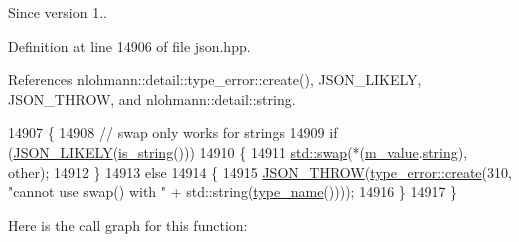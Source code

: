 \begin{DoxySince}{Since}
version 1.. 
\end{DoxySince}


Definition at line 14906 of file json.\+hpp.



References nlohmann\+::detail\+::type\+\_\+error\+::create(), J\+S\+O\+N\+\_\+\+L\+I\+K\+E\+LY, J\+S\+O\+N\+\_\+\+T\+H\+R\+OW, and nlohmann\+::detail\+::string.


\begin{DoxyCode}
14907     \{
14908         \textcolor{comment}{// swap only works for strings}
14909         \textcolor{keywordflow}{if} (\hyperlink{json_8hpp_a41ecd1c4cf7c3d56477b9b685b5daa72}{JSON\_LIKELY}(\hyperlink{classnlohmann_1_1basic__json_a69b596a4a6683b362095c9a139637396}{is\_string}()))
14910         \{
14911             \hyperlink{json_8hpp_a907191b7578e209391ce938e3b2afdf7}{std::swap}(*(\hyperlink{classnlohmann_1_1basic__json_aeb0814f76966f99290cb29e127c90a77}{m\_value}.\hyperlink{unionnlohmann_1_1basic__json_1_1json__value_a9856fb4271b50d738e14c5a9a2f05118}{string}), other);
14912         \}
14913         \textcolor{keywordflow}{else}
14914         \{
14915             \hyperlink{json_8hpp_a6c274f6db2e65c1b66c7d41b06ad690f}{JSON\_THROW}(\hyperlink{classnlohmann_1_1detail_1_1type__error_aecc083aea4b698c33d042670ba50c10f}{type\_error::create}(310, \textcolor{stringliteral}{"cannot use swap() with "} + 
      std::string(\hyperlink{classnlohmann_1_1basic__json_a9d0a478571f82f0163b96b2424cd998f}{type\_name}())));
14916         \}
14917     \}
\end{DoxyCode}
Here is the call graph for this function\+:
\mbox{\label{classnlohmann_1_1basic__json_a2566783e190dec524bf3445b322873b8}} 
